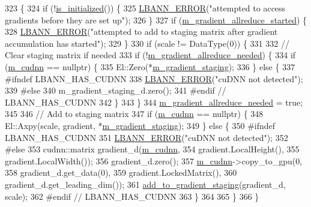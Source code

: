 \begin{DoxyCode}
323                                                         \{
324   \textcolor{keywordflow}{if} (!\hyperlink{classlbann_1_1optimizer_abccf0babf69e3d7c6e9a7fd0731c79b7}{is\_initialized}()) \{
325     \hyperlink{base_8hpp_a80b1d707117e968a6951b7222e4b2b87}{LBANN\_ERROR}(\textcolor{stringliteral}{"attempted to access gradients before they are set up"});
326   \}
327   \textcolor{keywordflow}{if} (\hyperlink{classlbann_1_1optimizer_ac77740a916f397600efae0c03bc5a045}{m\_gradient\_allreduce\_started}) \{
328     \hyperlink{base_8hpp_a80b1d707117e968a6951b7222e4b2b87}{LBANN\_ERROR}(\textcolor{stringliteral}{"attempted to add to staging matrix after gradient accumulation has started"});
329   \}
330   \textcolor{keywordflow}{if} (scale != DataType(0)) \{
331 
332     \textcolor{comment}{// Clear staging matrix if needed}
333     \textcolor{keywordflow}{if} (!\hyperlink{classlbann_1_1optimizer_a2dc18dcc3cf9510947304c3c5d059eb0}{m\_gradient\_allreduce\_needed}) \{
334       \textcolor{keywordflow}{if} (\hyperlink{classlbann_1_1optimizer_a2f24dbeaca18b06f4aa7d179bbf96680}{m\_cudnn} == \textcolor{keyword}{nullptr}) \{
335         El::Zero(*\hyperlink{classlbann_1_1optimizer_a92cd058d4f9fc8162d36d52461a96df2}{m\_gradient\_staging});
336       \} \textcolor{keywordflow}{else} \{
337 \textcolor{preprocessor}{        #ifndef LBANN\_HAS\_CUDNN}
338         \hyperlink{base_8hpp_a80b1d707117e968a6951b7222e4b2b87}{LBANN\_ERROR}(\textcolor{stringliteral}{"cuDNN not detected"});
339 \textcolor{preprocessor}{        #else}
340         m\_gradient\_staging\_d.zero();
341 \textcolor{preprocessor}{        #endif // LBANN\_HAS\_CUDNN}
342       \}
343     \}
344     \hyperlink{classlbann_1_1optimizer_a2dc18dcc3cf9510947304c3c5d059eb0}{m\_gradient\_allreduce\_needed} = \textcolor{keyword}{true};
345 
346     \textcolor{comment}{// Add to staging matrix}
347     \textcolor{keywordflow}{if} (\hyperlink{classlbann_1_1optimizer_a2f24dbeaca18b06f4aa7d179bbf96680}{m\_cudnn} == \textcolor{keyword}{nullptr}) \{
348       El::Axpy(scale, gradient, *\hyperlink{classlbann_1_1optimizer_a92cd058d4f9fc8162d36d52461a96df2}{m\_gradient\_staging});
349     \} \textcolor{keywordflow}{else} \{
350 \textcolor{preprocessor}{      #ifndef LBANN\_HAS\_CUDNN}
351       \hyperlink{base_8hpp_a80b1d707117e968a6951b7222e4b2b87}{LBANN\_ERROR}(\textcolor{stringliteral}{"cuDNN not detected"});
352 \textcolor{preprocessor}{      #else}
353       cudnn::matrix gradient\_d(\hyperlink{classlbann_1_1optimizer_a2f24dbeaca18b06f4aa7d179bbf96680}{m\_cudnn},
354                                gradient.LocalHeight(),
355                                gradient.LocalWidth());
356       gradient\_d.zero();
357       \hyperlink{classlbann_1_1optimizer_a2f24dbeaca18b06f4aa7d179bbf96680}{m\_cudnn}->copy\_to\_gpu(0,
358                            gradient\_d.get\_data(0),
359                            gradient.LockedMatrix(),
360                            gradient\_d.get\_leading\_dim());
361       \hyperlink{classlbann_1_1optimizer_ac23ebde61a225f70c27ab937df5755ed}{add\_to\_gradient\_staging}(gradient\_d, scale);
362 \textcolor{preprocessor}{      #endif // LBANN\_HAS\_CUDNN}
363     \}
364 
365   \}
366 \}
\end{DoxyCode}
